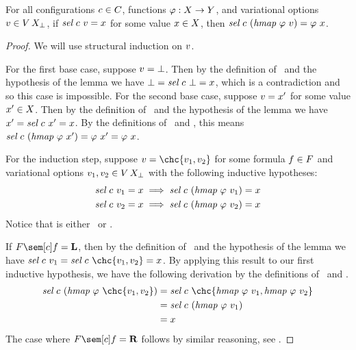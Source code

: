 \begin{lemma}
  \label{lem:vselsome}
  For all configurations $\color{black}c \in \color{black}C$, functions $\varphi : \color{black}X \to \color{black}Y$, and variational options $\color{black}v \in \color{black}V\,{\color{black}\color{black}X_{\color{black}\bot}}$, if
  $
    \color{black}\textit{sel}\ \color{black}c\ \color{black}v = \color{black}x
  $
  for some value $\color{black}x\in\color{black}X$, then
  $
    \sel\ \cE\ (\hmap\ \varphi\ \var) = \varphi\ \val
  $.
\end{lemma}

\begin{proof}
  We will use structural induction on $\color{black}v$.

  For the first base case, suppose $\color{black}v = \color{black}\bot$.
  Then by the definition of \sel\ and the hypothesis of the lemma we have $\color{black}\bot = \color{black}\textit{sel}\ \color{black}c\ \color{black}\bot = \color{black}x$, which is a contradiction and so this case is impossible.
  For the second base case, suppose $\color{black}v = \color{black}x'$ for some value $\color{black}x' \in \color{black}X$.
  Then by the definition of \sel\ and the hypothesis of the lemma we have $\color{black}x' = \color{black}\textit{sel}\ \color{black}c\ \color{black}x' = \color{black}x$.
  By the definitions of \hmap\ and \sel, this means
  $
    \color{black}\textit{sel}\ \color{black}c\ (\color{black}\textit{hmap}\ \varphi\ \color{black}x')
    = \varphi\ \color{black}x'
    = \varphi\ \color{black}x
  $.

  For the induction step, suppose $\var = \chc{\var_1, \var_2}$ for some formula $\color{black}f \in \color{black}F$ and variational options $\color{black}v_1, \color{black}v_2 \in \color{black}V\,{\color{black}\color{black}X_{\color{black}\bot}}$ with the following inductive hypotheses:
  \begin{align*}
    \color{black}\textit{sel}\ \color{black}c\ \color{black}v_1 = \color{black}x &\implies
    \color{black}\textit{sel}\ \color{black}c\ (\color{black}\textit{hmap}\ \varphi\ \color{black}v_1) = \color{black}x \\
    \color{black}\textit{sel}\ \color{black}c\ \color{black}v_2 = \color{black}x &\implies
    \color{black}\textit{sel}\ \color{black}c\ (\color{black}\textit{hmap}\ \varphi\ \color{black}v_2) = \color{black}x
  \end{align*}
  Notice that \fSem[\cE]{\fE} is either \tagL\ or \tagR.

  If $\fSem[\cE]{\fE} = \tagL$, then by the definition of \sel\ and the hypothesis of the lemma we have $\sel\ \cE\ \var_1 = \sel\ \cE\ \chc{\var_1, \var_2} = \val$.
  By applying this result to our first inductive hypothesis, we have the following derivation by the definitions of \hmap\ and \sel.
  \begin{align*}
    \sel\ \cE\ (\hmap\ \varphi\ \chc{\var_1, \var_2})
    &= \sel\ \cE\ \chc{\hmap\ \varphi\ \var_1, \hmap\ \varphi\ \var_2} \\
    &= \sel\ \cE\ (\hmap\ \varphi\ \var_1) \\
    &= \val
  \end{align*}
  The case where $\fSem[\cE]{\fE} = \tagR$ follows by similar reasoning, see .
\end{proof}

